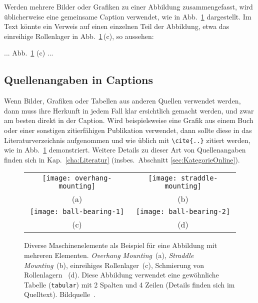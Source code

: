 Werden mehrere Bilder oder Grafiken zu einer Abbildung zusammengefasst, wird
üblicherweise eine gemeinsame Caption verwendet, wie in Abb.~\ref{fig:Bearings}
dargestellt. Im Text könnte ein Verweis auf einen einzelnen Teil der
Abbildung, etwa das einreihige Rollenlager in Abb.~\ref{fig:Bearings}\,(c),
so aussehen:
%
\begin{LaTeXCode}[numbers=none]
    ... Abb.~\ref{fig:Bearings} (c) ... 
\end{LaTeXCode}


\subsection{Quellenangaben in Captions}
\label{sec:QuellenangabenInCaptions}

Wenn Bilder, Grafiken oder Tabellen aus anderen Quellen verwendet werden,
dann muss ihre Herkunft in jedem Fall klar ersichtlich gemacht werden, und
zwar am besten direkt in der Caption. Wird beispielsweise eine Grafik aus
einem Buch oder einer sonstigen zitierfähigen Publikation verwendet, dann
sollte diese in das Literaturverzeichnis aufgenommen und wie üblich mit
\verb!\cite{..}! zitiert werden, wie in Abb.\ \ref{fig:Bearings} demonstriert.
Weitere Details zu dieser Art von Quellenangaben finden sich in Kap.\
\ref{cha:Literatur} (insbes.\ Abschnitt \ref{sec:KategorieOnline}).

\begin{figure}
	\centering\small
	\begin{tabular}{@{}c@{\hspace{12mm}}c@{}} %
		\texttt{[image: overhang-mounting]} &
		\texttt{[image: straddle-mounting]}
		\\
		(a) & (b)
		\\[4pt]    %
		\texttt{[image: ball-bearing-1]} &
		\texttt{[image: ball-bearing-2]}
		\\
		(c) & (d)
	\end{tabular}
%
	\caption{Diverse Maschinenelemente als Beispiel für eine Abbildung mit
	mehreren Elementen. \emph{Overhang Mounting}~(a), \emph{Straddle
	Mounting}~(b), einreihiges Rollenlager~(c), Schmierung von Rollenlagern~
	(d). Diese Abbildung verwendet eine gewöhnliche Tabelle
	(\texttt{tabular}) mit 2 Spalten und 4 Zeilen (Details finden sich im
	Quelltext). Bildquelle~\cite{Faires1934}.}
	\label{fig:Bearings}
\end{figure}


